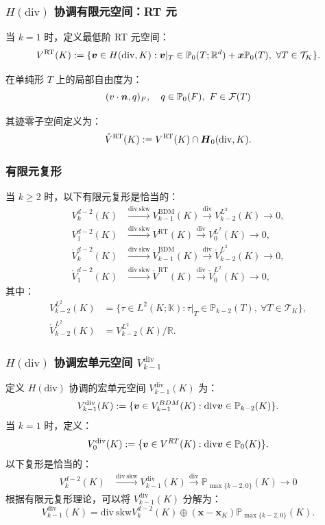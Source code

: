 \documentclass[notheorems,serif]{beamer}
\begin{document}
\begin{frame}
    \frametitle{$H(\mathrm{div})$ 协调有限元空间：RT 元}
当 $k=1$ 时，定义最低阶 RT 元空间：
$$
V^{\mathrm{RT}}(K) := \{\boldsymbol{v} \in H(\mathrm{div}, K) : \boldsymbol{v}|_T \in
\mathbb{P}_{0}(T; \mathbb{R}^d) + \boldsymbol{x}\mathbb{P}_{0}(T),\ \forall T \in \mathcal{T}_K\}.
$$

在单纯形 $T$ 上的局部自由度为：
$$
(v\cdot\boldsymbol{n},q)_{F}, \quad q\in\mathbb{P}_{0}(F),\ F\in\mathcal{F}(T)
$$

其迹零子空间定义为：
$$
\mathring{V}^{\mathrm{RT}}(K):=V^{\mathrm{RT}}(K)\cap\boldsymbol{H}_{0}(\mathrm{div},K).
$$
\end{frame}

\begin{frame}
    \frametitle{有限元复形}
    当 $k \geq 2$ 时，以下有限元复形是恰当的：
$$
\begin{aligned}
V_{k}^{d-2}(K) & \xrightarrow{\mathrm{div~skw}}
V_{k-1}^{\mathrm{BDM}}(K) \xrightarrow{\mathrm{div}} V_{k-2}^{L^{2}}(K)
\to 0, \\
V_{1}^{d-2}(K) & \xrightarrow{\mathrm{div~skw}}
V^{\mathrm{RT}}(K) \xrightarrow{\mathrm{div}} V_{0}^{L^{2}}(K)
\to 0, \\
\mathring{V}_{k}^{d-2}(K) & \xrightarrow{\mathrm{div~skw}}
\mathring{V}_{k-1}^{\mathrm{BDM}}(K) \xrightarrow{\mathrm{div}}
\mathring{V}_{k-2}^{L^{2}}(K) \to 0, \\
\mathring{V}_{1}^{d-2}(K) & \xrightarrow{\mathrm{div~skw}}
\mathring{V}^{\mathrm{RT}}(K) \xrightarrow{\mathrm{div}}
\mathring{V}_{0}^{L^{2}}(K) \to 0,
\end{aligned}
$$
其中：
$$
\begin{aligned}
V_{k-2}^{L^{2}}(K) &= \{\tau \in L^2(K; \mathbb{K}) : \tau|_T \in
\mathbb{P}_{k-2}(T),\ \forall T \in \mathcal{T}_K\},\\ 
\mathring{V}_{k-2}^{L^{2}}(K) &= V_{k-2}^{L^{2}}(K)/\mathbb{R}.
\end{aligned}
$$
\end{frame}

\begin{frame}
    \frametitle{$H(\mathrm{div})$ 协调宏单元空间 $V^{\mathrm{div}}_{k-1}$}
定义 $H(\mathrm{div})$ 协调的宏单元空间 $V^{\mathrm{div}}_{k-1}(K)$ 为：
$$
V^{\mathrm{div}}_{k-1}(K) := \{\boldsymbol{v} \in V^{BDM}_{k-1}(K) : \mathrm{div}
\boldsymbol{v} \in \mathbb{P}_{k-2}(K)\}.
$$
当 $k=1$ 时，定义：
$$
V^{\mathrm{div}}_{0}(K) := \{\boldsymbol{v} \in V^{RT}(K) : \mathrm{div}
\boldsymbol{v} \in \mathbb{P}_{0}(K)\}.
$$
以下复形是恰当的：
$$
\begin{aligned}
V_{k}^{d-2}(K) & \xrightarrow{\mathrm{div~skw}}
V^{\mathrm{div}}_{k-1}(K) \xrightarrow{\mathrm{div}}
\mathbb{P}_{\max\{k-2, 0\}}(K) \to 0
\end{aligned}
$$
根据有限元复形理论，可以将 $V^{\mathrm{div}}_{k-1}(K)$ 分解为：
$$
V^{\mathrm{div}}_{k-1}(K) = \mathrm{div~skw}V_{k}^{d-2}(K) \oplus 
(\boldsymbol{x-x}_K)\mathbb{P}_{\max\{k-2, 0\}}(K).
$$
\end{frame}
\end{document}
